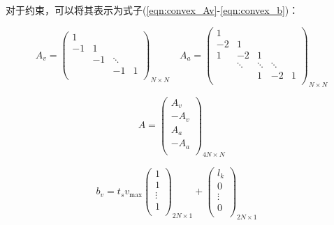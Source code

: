 对于约束，可以将其表示为式子(\ref{eqn:convex_Av}-\ref{eqn:convex_b})：

\begin{equation}
    A_v=\left( \begin{matrix}
        1&		&		&		\\
        -1&		1&		&		\\
        &		-1&		\ddots&		\\
        &		&		-1&		1\\
    \end{matrix} \right) _{N\times N}\quad A_a=\left( \begin{matrix}
        1&		&		&		&		\\
        -2&		1&		&		&		\\
        1&		-2&		1&		&		\\
        &		\ddots&		\ddots&		\ddots&		\\
        &		&		1&		-2&		1\\
    \end{matrix} \right) _{N\times N}
    \label{eqn:convex_Av}
\end{equation}

\begin{equation}
    A=\left( \begin{array}{c}
        A_v\\
        -A_v\\
        A_a\\
        -A_a\\
    \end{array} \right) _{4N\times N}
\end{equation}

\begin{equation}
    b_v=t_sv_{\max}\left( \begin{array}{c}
        1\\
        1\\
        \vdots\\
        1\\
    \end{array} \right) _{2N\times 1}+\left( \begin{array}{c}
        l_k\\
        0\\
        \vdots\\
        0\\
    \end{array} \right) _{2N\times 1}\quad 
\end{equation}

